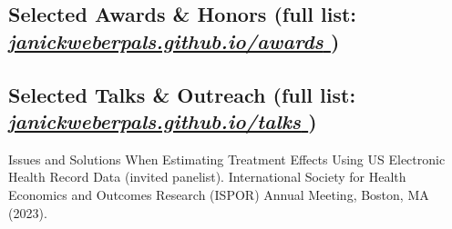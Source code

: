 \documentclass[letterpaper]{twentysecondcv} %
\begin{document}


\subsection{Selected Awards \& Honors \small(full list: \href{https://janickweberpals.github.io/awards}{\textit{janickweberpals.github.io/awards \ExternalLink}})}

\begin{twentyshort} %
\end{twentyshort}


\subsection{Selected Talks \& Outreach \small(full list: \href{https://janickweberpals.github.io/talks}{\textit{janickweberpals.github.io/talks \ExternalLink}})}

Issues and Solutions When Estimating Treatment Effects Using US Electronic Health Record Data (invited panelist). International Society for Health Economics and Outcomes Research (ISPOR) Annual Meeting, Boston, MA (2023).

\end{document}
